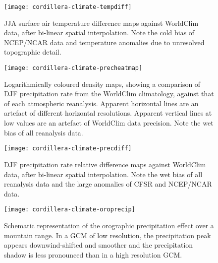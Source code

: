 \begin{figure}[t]
	\vspace*{2mm}
	\begin{center}
		\texttt{[image: cordillera-climate-tempdiff]}
	\end{center}
	\caption{JJA surface air temperature difference maps against WorldClim data, after bi-linear spatial interpolation. Note the cold bias of NCEP/NCAR data and temperature anomalies due to unresolved topographic detail.}
	\label{fig:tempdiff}
\end{figure}

\begin{figure}[t]
	\vspace*{2mm}
	\begin{center}
		\texttt{[image: cordillera-climate-precheatmap]}
	\end{center}
	\caption{Logarithmically coloured density maps, showing a comparison of DJF precipitation rate from the WorldClim climatology, against that of each atmospheric reanalysis. Apparent horizontal lines are an artefact of different horizontal resolutions. Apparent vertical lines at low values are an artefact of WorldClim data precision. Note the wet bias of all reanalysis data.}
	\label{fig:precheatmap}
\end{figure}

\begin{figure}[t]
	\vspace*{2mm}
	\begin{center}
		\texttt{[image: cordillera-climate-precdiff]}
	\end{center}
	\caption{DJF precipitation rate relative difference maps against WorldClim data, after bi-linear spatial interpolation. Note the wet bias of all reanalysis data and the large anomalies of CFSR and NCEP/NCAR data.}
	\label{fig:precdiff}
\end{figure}

\begin{figure}[t]
	\vspace*{2mm}
	\begin{center}
		\texttt{[image: cordillera-climate-oroprecip]}
	\end{center}
	\caption{Schematic representation of the orographic precipitation effect over a mountain range. In a GCM of low resolution, the precipitation peak appears downwind-shifted and smoother and the precipitation shadow is less pronounced than in a high resolution GCM.}
	\label{fig:oroprecip}
\end{figure}


